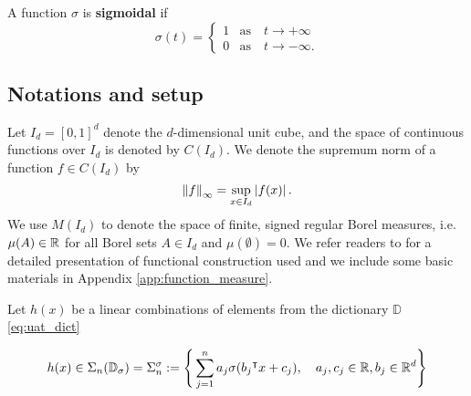 

\begin{definition}\label{def:sigmoidal}
    A function $\sigma$ is \textbf{sigmoidal} if
    \begin{equation}
        \sigma(t) =
        \begin{cases}
            1 & \text{as} \quad t \to +\infty \\
            0 & \text{as} \quad t \to -\infty.
        \end{cases}
    \end{equation}
\end{definition}

\subsection*{Notations and setup}

Let $I_d = [0,1]^d$ denote the $d$-dimensional unit cube, and the space of
continuous functions over $I_d$ is denoted by $C(I_d)$. We denote the supremum
norm of a function $f \in C(I_d)$ by
\begin{equation}
    \label{def:sup_norm}
    \left\| f \right\|_{\infty} = \sup_{x\in I_d} \left| f(x) \right|.
\end{equation}
We use $M(I_d)$ to denote the space of finite, signed regular Borel measures,
i.e. $\mu(A) \in \mathbb{R}$ for all Borel sets $A \in I_d$ and $\mu(\emptyset)= 0$. We
refer readers to \cite{rudinFunctionalAnalysis1991,
rudinRealComplexAnalysis1987} for a detailed presentation of functional
construction used and we include some basic materials in Appendix
\ref{app:function_measure}.

Let $h(x)$ be a linear combinations of elements from the dictionary $\mathbb{D}$
\eqref{eq:uat_dict}

\begin{align}
    \label{eq:sum_sigma}
    h(x) \in 
    \Sigma_n(\mathbb{D}_{\sigma}) = \Sigma_n^{\sigma} := \Bigg\{
        \sum_{j=1}^n a_j \sigma(b_j{}^{\intercal} x + c_j), \quad
        a_j, c_j \in \mathbb{R},  b_j \in \mathbb{R}^d
    \Bigg\}
\end{align}

